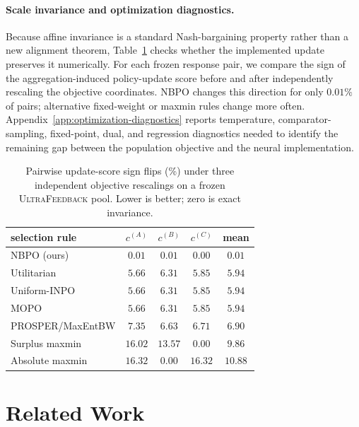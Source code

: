 \documentclass{article}
\theoremstyle{remark}
\theoremstyle{plain}
\newcommand{\NBPO}{\textsc{NBPO}}
\begin{document}
\paragraph{Scale invariance and optimization diagnostics.}
Because affine invariance is a standard Nash-bargaining property rather than a new alignment theorem, Table~\ref{tab:uf-scale-covariance} checks whether the implemented update preserves it numerically. For each frozen response pair, we compare the sign of the aggregation-induced policy-update score before and after independently rescaling the objective coordinates. \NBPO{} changes this direction for only $0.01\%$ of pairs; alternative fixed-weight or maxmin rules change more often. Appendix~\ref{app:optimization-diagnostics} reports temperature, comparator-sampling, fixed-point, dual, and regression diagnostics needed to identify the remaining gap between the population objective and the neural implementation.

\begin{table}[t]
\centering\footnotesize
\setlength{\tabcolsep}{4.0pt}
\caption{Pairwise update-score sign flips (\%) under three independent objective rescalings on a frozen \textsc{UltraFeedback} pool. Lower is better; zero is exact invariance.}
\label{tab:uf-scale-covariance}
\begin{tabular}{lcccc}
\toprule
selection rule & $c^{(A)}$ & $c^{(B)}$ & $c^{(C)}$ & mean\\
\midrule
\NBPO{} (ours) & $\mathbf{0.01}$ & $\mathbf{0.01}$ & $\mathbf{0.00}$ & $\mathbf{0.01}$\\
Utilitarian & $5.66$ & $6.31$ & $5.85$ & $5.94$\\
Uniform-INPO & $5.66$ & $6.31$ & $5.85$ & $5.94$\\
MOPO & $5.66$ & $6.31$ & $5.85$ & $5.94$\\
PROSPER/MaxEntBW & $7.35$ & $6.63$ & $6.71$ & $6.90$\\
Surplus maxmin & $16.02$ & $13.57$ & $0.00$ & $9.86$\\
Absolute maxmin & $16.32$ & $0.00$ & $16.32$ & $10.88$\\
\bottomrule
\end{tabular}
\end{table}

\section{Related Work}
\label{sec:related}
\end{document}
